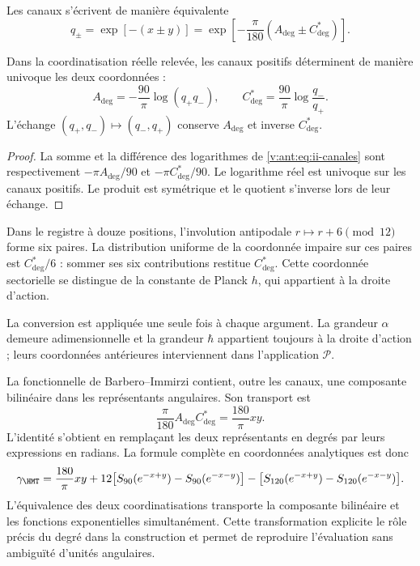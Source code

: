 Les canaux s'écrivent de manière équivalente
\begin{equation}
 q_\pm=\exp[-(x\pm y)]
 =\exp\!\left[-\frac{\pi}{180}(A_{\deg}\pm C^*_{\deg})\right].
\label{v:ant:eq:ii-canales}
\end{equation}
\begin{proposition}
\label{v:ant:prop:ii-inversion-canales-angulares}
Dans la coordinatisation réelle relevée, les canaux positifs déterminent
de manière univoque les deux coordonnées :
\[
 A_{\deg}=-\frac{90}{\pi}\log(q_+q_-),\qquad
 C^*_{\deg}=\frac{90}{\pi}\log\frac{q_-}{q_+}.
\]
L'échange \((q_+,q_-)\mapsto(q_-,q_+)\) conserve
\(A_{\deg}\) et inverse \(C^*_{\deg}\).
\end{proposition}
\begin{proof}
La somme et la différence des logarithmes de
\eqref{v:ant:eq:ii-canales} sont respectivement
\(-\pi A_{\deg}/90\) et \(-\pi C^*_{\deg}/90\).
Le logarithme réel est univoque sur les canaux positifs.
Le produit est symétrique et le quotient s'inverse lors de leur échange.
\end{proof}
Dans le registre à douze positions, l'involution antipodale
\(r\mapsto r+6\pmod {12}\) forme six paires. La distribution
uniforme de la coordonnée impaire sur ces paires est
\(C^*_{\deg}/6\) : sommer ses six contributions restitue
\(C^*_{\deg}\). Cette coordonnée sectorielle se distingue de
la constante de Planck \(h\), qui appartient à la droite d'action.

La conversion est appliquée une seule fois à chaque argument. La grandeur
\(\alpha\) demeure adimensionnelle et la grandeur \(\hbar\)
appartient toujours à la droite d'action ; leurs coordonnées antérieures
interviennent dans l'application \(\mathcal P\).

La fonctionnelle de Barbero--Immirzi contient, outre les canaux, une
composante bilinéaire dans les représentants angulaires. Son transport est
\begin{equation}
 \frac{\pi}{180}A_{\deg}C^*_{\deg}
 =\frac{180}{\pi}xy.
 \label{v:ant:eq:ii-barbero-cartas}
\end{equation}
L'identité s'obtient en remplaçant les deux représentants en degrés
par leurs expressions en radians. La formule complète en
coordonnées analytiques est donc
\[
 \gamma_{\HMT}
 =\frac{180}{\pi}xy
 +12\bigl[S_{90}(e^{-x+y})-S_{90}(e^{-x-y})\bigr]
 -\bigl[S_{120}(e^{-x+y})-S_{120}(e^{-x-y})\bigr].
\]
L’équivalence des deux coordinatisations transporte la composante bilinéaire
et les fonctions exponentielles simultanément. Cette transformation
explicite le rôle précis du degré dans la construction et permet
de reproduire l’évaluation sans ambiguïté d’unités angulaires.
